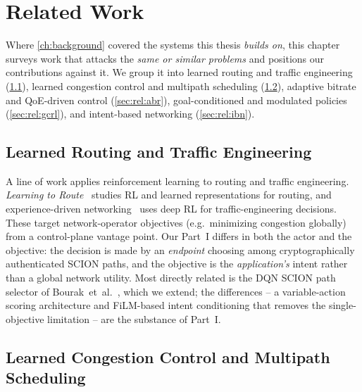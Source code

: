 \chapter{Related Work}
\label{ch:related}

Where \cref{ch:background} covered the systems this thesis \emph{builds on}, this chapter surveys work that
attacks the \emph{same or similar problems} and positions our contributions against it. We group it into
learned routing and traffic engineering (\cref{sec:rel:routing}), learned congestion control and multipath
scheduling (\cref{sec:rel:transport}), adaptive bitrate and QoE-driven control (\cref{sec:rel:abr}),
goal-conditioned and modulated policies (\cref{sec:rel:gcrl}), and intent-based networking
(\cref{sec:rel:ibn}).

\section{Learned Routing and Traffic Engineering}
\label{sec:rel:routing}

A line of work applies reinforcement learning to routing and traffic engineering. \emph{Learning to
Route}~\cite{Valadarsky2017} studies RL and learned representations for routing, and experience-driven
networking~\cite{Xu2018} uses deep RL for traffic-engineering decisions. These target network-operator
objectives (e.g.\ minimizing congestion globally) from a control-plane vantage point. Our Part~I differs in
both the actor and the objective: the decision is made by an \emph{endpoint} choosing among
cryptographically authenticated SCION paths, and the objective is the \emph{application's} intent rather than
a global network utility. Most directly related is the DQN SCION path selector of
Bourak~et~al.~\cite{Bourak2025}, which we extend; the differences -- a variable-action scoring architecture
and FiLM-based intent conditioning that removes the single-objective limitation -- are the substance of
Part~I.

\section{Learned Congestion Control and Multipath Scheduling}
\label{sec:rel:transport}


